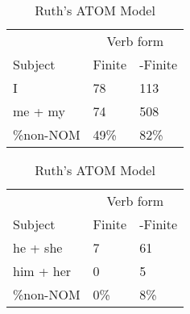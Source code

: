 \begin{table}[]
    \caption{Ruth's ATOM Model}
    \begin{minipage}{0.5\textwidth}
    \centering
    \begin{tabular}{@{}lll@{}}
        \toprule
         &\multicolumn{2}{c}{Verb form}\\
         \cline{2-3}
        Subject & Finite & -Finite \\
        \midrule
        I & 78 & 113 \\
        me + my & 74 & 508 \\
        \hline
        \%non-NOM & 49\% & 82\% \\
        \bottomrule
    \end{tabular}
\end{minipage}
\begin{minipage}{0.5\textwidth}
    \centering
    \begin{tabular}{@{}lll@{}}
        \toprule
         &\multicolumn{2}{c}{Verb form}\\
         \cline{2-3}
        Subject & Finite & -Finite \\
        \midrule
        he + she & 7 & 61 \\
        him + her & 0 & 5 \\
        \hline
        \%non-NOM & 0\% & 8\% \\
        \bottomrule
    \end{tabular}
    \end{minipage}
    \begin{minipage}{0.5\textwidth}
    

\end{minipage}
\end{table}
